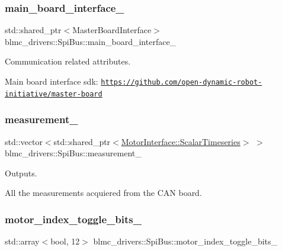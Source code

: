 \subsubsection{\texorpdfstring{main\+\_\+board\+\_\+interface\+\_\+}{main\_board\_interface\_}}
{\footnotesize\ttfamily std\+::shared\+\_\+ptr$<$Master\+Board\+Interface$>$ blmc\+\_\+drivers\+::\+Spi\+Bus\+::main\+\_\+board\+\_\+interface\+\_\+\hspace{0.3cm}{\ttfamily [private]}}



Communication related attributes. 

Main board interface sdk\+: \href{https://github.com/open-dynamic-robot-initiative/master-board}{\tt https\+://github.\+com/open-\/dynamic-\/robot-\/initiative/master-\/board} \mbox{\label{classblmc__drivers_1_1SpiBus_ae3ad20f9cd7e06585b3af84697870cfa}} 
\subsubsection{\texorpdfstring{measurement\+\_\+}{measurement\_}}
{\footnotesize\ttfamily std\+::vector$<$std\+::shared\+\_\+ptr$<$\hyperlink{classblmc__drivers_1_1MotorInterface_a49b8fc916b9f9debbd7b0988463db5cd}{Motor\+Interface\+::\+Scalar\+Timeseries}$>$ $>$ blmc\+\_\+drivers\+::\+Spi\+Bus\+::measurement\+\_\+\hspace{0.3cm}{\ttfamily [private]}}



Outputs. 

All the measurements acquiered from the C\+AN board. \mbox{\label{classblmc__drivers_1_1SpiBus_a5805dd95171df8f26efdae85ea02662c}} 
\subsubsection{\texorpdfstring{motor\+\_\+index\+\_\+toggle\+\_\+bits\+\_\+}{motor\_index\_toggle\_bits\_}}
{\footnotesize\ttfamily std\+::array$<$bool, 12$>$ blmc\+\_\+drivers\+::\+Spi\+Bus\+::motor\+\_\+index\+\_\+toggle\+\_\+bits\+\_\+\hspace{0.3cm}{\ttfamily [private]}}



